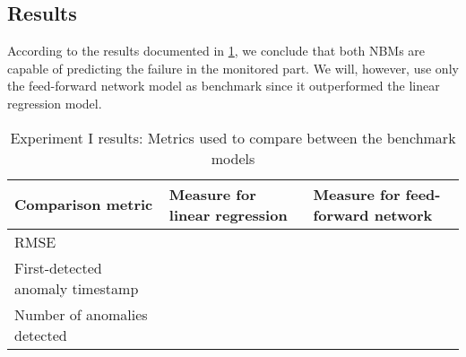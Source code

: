 \subsection{Results}
According to the results documented in \ref{tab:Experiment I results}, we conclude that both NBMs are capable of predicting the failure in the monitored part. We will, however, use only the feed-forward network model as benchmark since it outperformed the linear regression model.
\begin{table}[H]
        \centering
    \begin{tabular}{|m{4cm}|m{4cm}|m{4cm}|}
    \hline
         \textbf{Comparison metric} & \textbf{Measure for linear regression}   & \textbf{Measure for feed-forward network}\\
         \hline
         RMSE & & \\
         \hline
         First-detected anomaly timestamp & & \\
         \hline
         Number of anomalies detected & & \\
         \hline
    \hline
    \end{tabular}
    \caption{Experiment I results: Metrics used to compare between the benchmark models}
        \label{tab:Experiment I results}
\end{table}